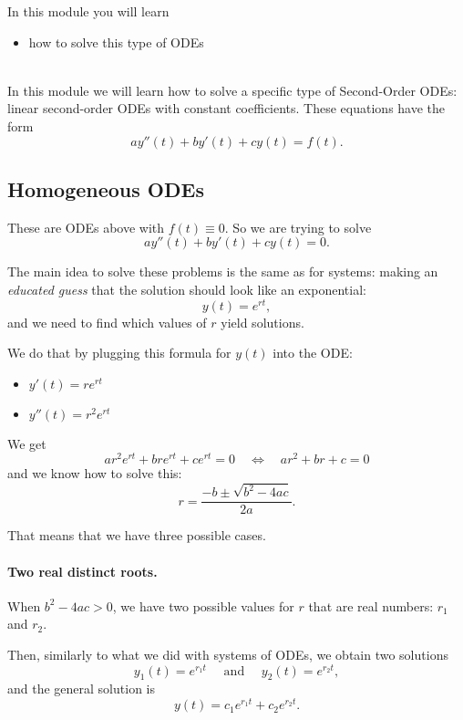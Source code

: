 In this module you will learn
\begin{itemize}
	\item how to solve this type of ODEs
\end{itemize}

\hfill \\

In this module we will learn how to solve a specific type of Second-Order ODEs: linear second-order ODEs with constant coefficients. These equations have the form
$$
a y''(t)  + b y'(t) + c y(t) = f(t).
$$

\subsection{Homogeneous ODEs}

These are ODEs above with $f(t) \equiv 0$.
So we are trying to solve
$$
a y''(t)  + b y'(t) + c y(t) = 0.
$$

The main idea to solve these problems is the same as for systems: making an \emph{educated guess} that the solution should look like an exponential:
$$
y(t) = e^{rt},
$$
and we need to find which values of $r$ yield solutions.

We do that by plugging this formula for $y(t)$ into the ODE:
\begin{itemize}
	\item $y'(t) = r e^{rt}$
	\item $y''(t) = r^2 e^{rt}$
\end{itemize}

We get
$$
a r^2 e^{rt} + br e^{rt} + c e^{rt} = 0
\quad \Leftrightarrow \quad 
	a r^2 + br + c = 0
$$
and we know how to solve this:
$$
r = \frac{-b \pm \sqrt{b^2-4ac}}{2a}.
$$

That means that we have three possible cases.





\paragraph{\color{cyan}Two real distinct roots.} When $b^2-4ac > 0$, we have two possible values for $r$ that are real numbers: $r_1$ and $r_2$.

Then, similarly to what we did with systems of ODEs, we obtain two solutions
$$
y_1(t) = e^{r_1 t} \quad \text{ and } \quad y_2(t) = e^{r_2 t},
$$
and the general solution is
$$
y(t) = c_1 e^{r_1 t} + c_2 e^{r_2 t}.
$$




